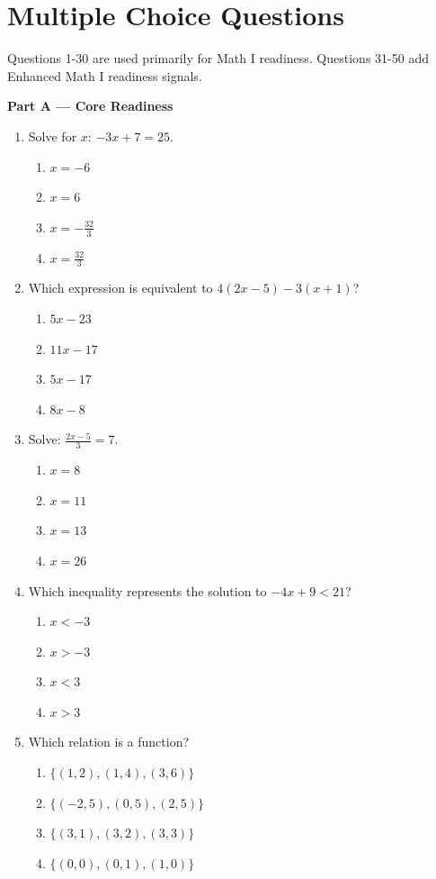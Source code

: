 \documentclass[11pt]{article}
\begin{document}
\section*{Multiple Choice Questions}
\begin{sectionNote}
Questions 1-30 are used primarily for Math I readiness. Questions 31-50 add Enhanced Math I readiness signals.
\end{sectionNote}
\begin{partBox}
{\large \textcolor{nppurple2}{\textbf{Part A --- Core Readiness}}}
\end{partBox}
\begin{enumerate}
\item Solve for $x$: $-3x+7=25$.
\begin{enumerate}[label=(\Alph*)]
\item $x=-6$ \item $x=6$ \item $x=-\frac{32}{3}$ \item $x=\frac{32}{3}$
\end{enumerate}

\item Which expression is equivalent to $4(2x-5)-3(x+1)$?
\begin{enumerate}[label=(\Alph*)]
\item $5x-23$ \item $11x-17$ \item $5x-17$ \item $8x-8$
\end{enumerate}

\item Solve: $\frac{2x-5}{3}=7$.
\begin{enumerate}[label=(\Alph*)]
\item $x=8$ \item $x=11$ \item $x=13$ \item $x=26$
\end{enumerate}

\item Which inequality represents the solution to $-4x+9<21$?
\begin{enumerate}[label=(\Alph*)]
\item $x<-3$ \item $x>-3$ \item $x<3$ \item $x>3$
\end{enumerate}

\item Which relation is a function?
\begin{enumerate}[label=(\Alph*)]
\item $\{(1,2),(1,4),(3,6)\}$ \item $\{(-2,5),(0,5),(2,5)\}$
\item $\{(3,1),(3,2),(3,3)\}$ \item $\{(0,0),(0,1),(1,0)\}$
\end{enumerate}


\end{enumerate}
\end{document}
